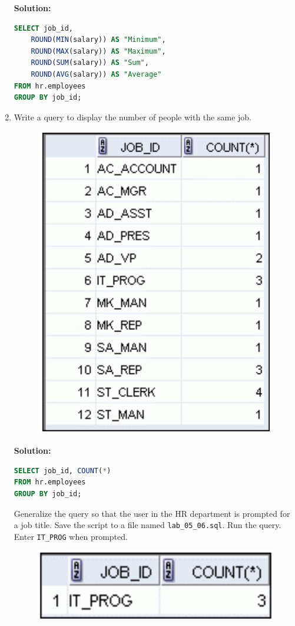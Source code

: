 \documentclass[a4paper,12pt]{article}
\begin{document}
\begin{enumerate}
    \textbf{Solution: }
    \begin{lstlisting}[language=SQL]
SELECT job_id,
    ROUND(MIN(salary)) AS "Minimum",
    ROUND(MAX(salary)) AS "Maximum",
    ROUND(SUM(salary)) AS "Sum",
    ROUND(AVG(salary)) AS "Average"
FROM hr.employees
GROUP BY job_id;
    \end{lstlisting}
    \newpage
        \item Write a query to display the number of people with the same job.
    \begin{figure}[h]
        \centering
        \includegraphics[width=.45\linewidth]{graphics/66.1.png}
    \end{figure}

    \textbf{Solution: }
    \begin{lstlisting}[language=SQL]
SELECT job_id, COUNT(*) 
FROM hr.employees
GROUP BY job_id;
    \end{lstlisting}
    Generalize the query so that the user in the HR department is prompted for a job title. Save the script
to a file named \texttt{lab\_05\_06.sql}. Run the query. Enter \texttt{IT\_PROG} when prompted.
    \begin{figure}[h]
        \centering
        \includegraphics[width=.4\linewidth]{graphics/66.2.png}
    \end{figure}


\end{enumerate}
\end{document}
